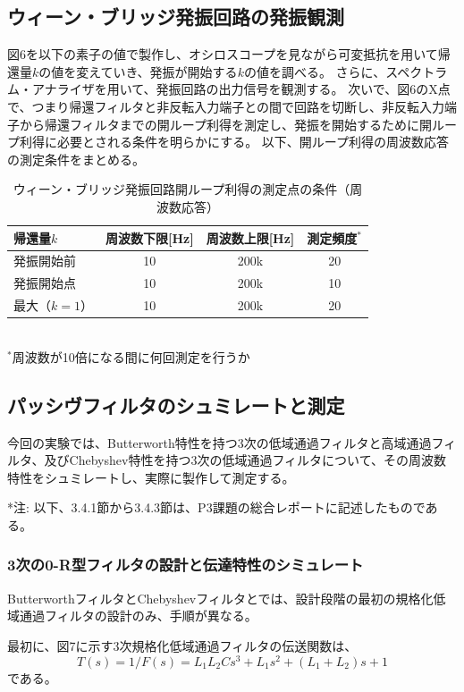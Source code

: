 \documentclass[10pt,a4j,dvipdfmx]{jsarticle}
\makeatletter
\let\@oldsubsec\subsection
\renewcommand{\subsection}[1]{\vspace{-7pt}\@oldsubsec{#1}}
\makeatother
\begin{document}
\subsection{ウィーン・ブリッジ発振回路の発振観測}
図6を以下の素子の値で製作し、オシロスコープを見ながら可変抵抗を用いて帰還量$k$の値を変えていき、発振が開始する$k$の値を調べる。
さらに、スペクトラム・アナライザを用いて、発振回路の出力信号を観測する。
次いで、図6のX点で、つまり帰還フィルタと非反転入力端子との間で回路を切断し、非反転入力端子から帰還フィルタまでの開ループ利得を測定し、発振を開始するために開ループ利得に必要とされる条件を明らかにする。
以下、開ループ利得の周波数応答の測定条件をまとめる。
\begin{table}[htb]
  \begin{center}
    \caption{ウィーン・ブリッジ発振回路開ループ利得の測定点の条件（周波数応答）}
    \begin{tabular}{|l||c|c|c|} \hline
      帰還量$k$ & 周波数下限[\si{\hertz}] & 周波数上限[\si{\hertz}] & 測定頻度$^*$\\ \hline \hline
      発振開始前 & 10 & 200k & 20\\
      発振開始点 & 10 & 200k & 10 \\ 
      最大（$k=1$）& 10 & 200k & 20 \\ 
      \hline
    \end{tabular}
    \\ $^*$周波数が10倍になる間に何回測定を行うか
  \end{center}
\end{table}

\subsection{パッシヴフィルタのシュミレートと測定}
今回の実験では、Butterworth特性を持つ3次の低域通過フィルタと高域通過フィルタ、及びChebyshev特性を持つ3次の低域通過フィルタについて、その周波数特性をシュミレートし、実際に製作して測定する。

*注: 以下、3.4.1節から3.4.3節は、P3課題の総合レポートに記述したものである。
\subsubsection{3次の0-R型フィルタの設計と伝達特性のシミュレート}
ButterworthフィルタとChebyshevフィルタとでは、設計段階の最初の規格化低域通過フィルタの設計のみ、手順が異なる。

最初に、図7に示す3次規格化低域通過フィルタの伝送関数は、
\begin{equation}
T(s) = 1/F(s) = L_1L_2C s^3 + L_1 s^2 + \left( L_1+L_2\right) s + 1
\end{equation}
である。
\end{document}
